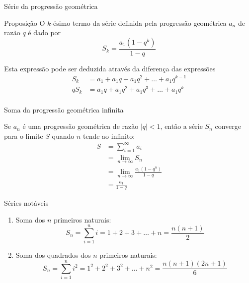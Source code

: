 \begin{frame}[fragile]{Série da progressão geométrica}

    \begin{block}{Proposição}
        O $k$-ésimo termo da série definida pela progressão geométrica $a_n$ de razão $q$ é dado por
        $$
            S_k = \frac{a_1(1 - q^k)}{1 - q}
        $$
    \end{block}

    \vspace{0.2in}

Esta expressão pode ser deduzida através da diferença das expressões
$$
\begin{array}{rl}
    S_k\! \! \! \! &= a_1 + a_1q + a_1q^2 + \ldots + a_1q^{k - 1} \\
    qS_k\! \! \! \! &= a_1q + a_1q^2 + a_1q^3 + \ldots + a_1q^k \\
\end{array}
$$
\end{frame}

\begin{frame}[fragile]{Soma da progressão geométrica infinita}

Se $a_n$ é uma progressão geométrica de razão $|q| < 1$, então a série $S_n$ converge para o limite $S$ quando $n$ tende ao infinito:
\begin{align*}
    S &= \sum_{i = 1}^\infty a_i \\
      &= \lim_{n\to \infty} S_n \\
      & = \lim_{n\to \infty} \frac{a_1(1 - q^n)}{1 - q}\\
      & = \frac{a_1}{1 - q}
\end{align*}

\end{frame}

\begin{frame}[fragile]{Séries notáveis}

    \begin{enumerate}
        \item Soma dos $n$ primeiros naturais:
$$
    S_n = \sum_{i = 1}^n i = 1 + 2 + 3 + \ldots + n = \frac{n(n + 1)}{2}
$$

        \item Soma dos quadrados dos $n$ primeiros naturais:
$$
    S_n = \sum_{i = 1}^n i^2 = 1^2 + 2^2 + 3^2 + \ldots + n^2 = \frac{n(n + 1)(2n + 1)}{6}
$$

    \end{enumerate}

\end{frame}

